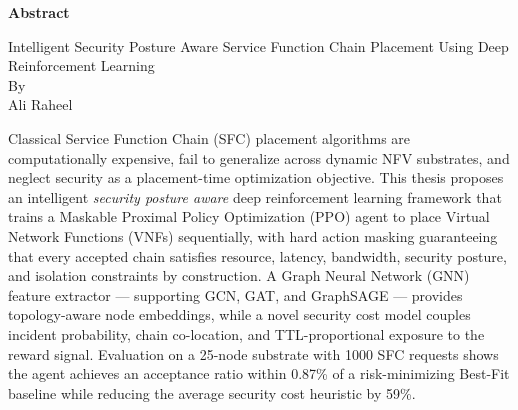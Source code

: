 \newpage
\begin{center}
\LARGE{\textbf{\textbf{Abstract}}}
\end{center}
\begin{center}
\Large{Intelligent Security Posture Aware Service Function Chain Placement Using Deep Reinforcement Learning}\\
\Large{By}\\
\Large{Ali Raheel}
\end{center}

Classical Service Function Chain (SFC) placement algorithms are computationally expensive, fail to generalize across dynamic NFV substrates, and neglect security as a placement-time optimization objective. This thesis proposes an intelligent \textit{security posture aware} deep reinforcement learning framework that trains a Maskable Proximal Policy Optimization (PPO) agent to place Virtual Network Functions (VNFs) sequentially, with hard action masking guaranteeing that every accepted chain satisfies resource, latency, bandwidth, security posture, and isolation constraints by construction. A Graph Neural Network (GNN) feature extractor — supporting GCN, GAT, and GraphSAGE — provides topology-aware node embeddings, while a novel security cost model couples incident probability, chain co-location, and TTL-proportional exposure to the reward signal. Evaluation on a 25-node substrate with 1000 SFC requests shows the agent achieves an acceptance ratio within 0.87\% of a risk-minimizing Best-Fit baseline while reducing the average security cost heuristic by 59\%.
